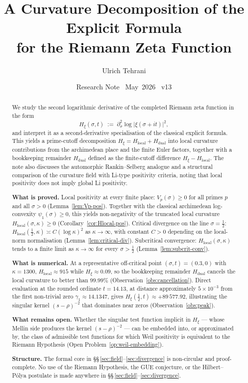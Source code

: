 \documentclass[11pt]{article}
\title{\vspace{-1.5em}\bfseries
A Curvature Decomposition of the Explicit Formula\\[0.4em]
\large for the Riemann Zeta Function}
\author{Ulrich Tehrani}
\date{Research Note \textperiodcentered\ May~2026
      \textperiodcentered\ v13}
\newcommand{\Hxi}{H_{\xi}}
\newcommand{\Hlocal}{H_{\mathrm{local}}}
\newcommand{\Hdual}{H_{\mathrm{dual}}}
\begin{document}
\maketitle

\begin{abstract}
We study the second logarithmic derivative of the completed
Riemann zeta function in the form
\[
\Hxi(\sigma,t)\;:=\;\partial_{\sigma}^{2}\log
\lvert\xi(\sigma+it)\rvert^{2},
\]
and interpret it as a second-derivative specialisation of the
classical explicit formula. This yields a prime-cutoff
decomposition $\Hxi=\Hlocal+\Hdual$ into local curvature
contributions from the archimedean place and the finite Euler
factors, together with a bookkeeping remainder $\Hdual$
defined as the finite-cutoff difference $\Hxi-\Hlocal$.
The note also discusses the automorphic Rankin--Selberg
analogue and a structural comparison of the curvature field
with Li-type positivity criteria, noting that local positivity
does not imply global Li positivity.

\textbf{What is proved.}
Local positivity at every finite place: $V_p(\sigma)\ge 0$ for
all primes $p$ and all $\sigma>0$ (Lemma~\ref{lem:Vp-pos}).
Together with the classical archimedean log-convexity
$\psi_1(\sigma)\ge 0$, this yields non-negativity of the
truncated local curvature $\Hlocal(\sigma,\kappa)\ge 0$
(Corollary~\ref{cor:Hlocal-pos}).
Critical divergence on the line $\sigma=\tfrac12$:
$\Hlocal(\tfrac12,\kappa)\asymp C(\log\kappa)^{2}$ as
$\kappa\to\infty$, with constant $C>0$ depending on the
local-norm normalisation (Lemma~\ref{lem:critical-div}).
Subcritical convergence: $\Hlocal(\sigma,\kappa)$ tends to a
finite limit as $\kappa\to\infty$ for every $\sigma>\tfrac12$
(Lemma~\ref{lem:subcrit-conv}).

\textbf{What is numerical.}
At a representative off-critical point $(\sigma,t)=(0.3,0)$
with $\kappa=1300$, $\Hlocal\approx 915$ while
$\Hxi\approx 0.09$, so the bookkeeping remainder $\Hdual$
cancels the local curvature to better than $99.99\%$
(Observation~\ref{obs:cancellation}).
Direct evaluation at the rounded ordinate $t=14.13$, at
distance approximately $5\times 10^{-3}$ from the first
non-trivial zero $\gamma_1\approx 14.1347$, gives
$\Hxi(\tfrac12,t)\approx +89\,577.92$, illustrating the
singular kernel $(s-\rho)^{-2}$ that dominates near zeros
(Observation~\ref{obs:peak}).

\textbf{What remains open.}
Whether the singular test function implicit in $\Hxi$ ---
whose Mellin side produces the kernel $(s-\rho)^{-2}$ --- can
be embedded into, or approximated by, the class of admissible
test functions for which Weil positivity is equivalent to the
Riemann Hypothesis (Open Problem~\ref{op:weil-embedding}).

\textbf{Structure.}
The formal core in
\S\S\,\ref{sec:field}--\ref{sec:divergence} is non-circular
and proof-complete.
No use of the Riemann Hypothesis, the GUE conjecture, or the
Hilbert--P\'olya postulate is made anywhere in
\S\S\,\ref{sec:field}--\ref{sec:divergence}.
\end{abstract}
\end{document}
